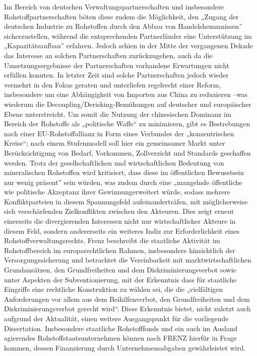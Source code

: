 \documentclass[12pt,a4paper,oneside]{book} %
\begin{document}
Im Bereich von deutschen Verwaltungspartnerschaften und insbesondere Rohstoffpartnerschaften böten diese zudem die Möglichkeit, den „Zugang der deutschen Industrie zu Rohstoffen durch den Abbau von Handelshemmnissen” sicherzustellen, während die entsprechenden Partnerländer eine Unterstützung im „Kapazitätsaufbau” erfahren.\autocite{ruttinger_deutschen_2016} Jedoch schien in der Mitte der vergangenen Dekade das Interesse an solchen Partnerschaften zurückzugehen, auch da die Umsetzungsergebnisse der Partnerschaften vorhandene Erwartungen nicht erfüllen konnten.\autocite{ruttinger_deutschen_2016} In letzter Zeit sind solche Partnerschaften jedoch wieder vermehrt in den Fokus geraten und unterliefen regelrecht einer \glqq Reform\grqq, insbesondere um eine Abhängigkeit von Importen aus China zu reduzieren\autocite{muller_reform_2023} --was wiederum die Decoupling/Derisking-Bemühungen auf deutscher und europäischer Ebene unterstreicht. Um somit die Nutzung der chinesischen Dominanz im Bereich der Rohstoffe als „politische Waffe“ zu minimieren, gibt es Bestrebungen nach einer EU-Rohstoffallianz in Form eines Verbundes der „konzentrischen Kreise“; nach einem Stufenmodell soll hier ein gemeinsamer Markt unter Berücksichtigung von Bedarf, Vorkommen, Zollverzicht und Standards geschaffen werden.\autocite{sauga_klub_2023} Trotz der gesellschaftlichen und wirtschaftlichen Bedeutung von mineralischen Rohstoffen wird kritisiert, dass diese im \glqq öffentlichen Bewusstsein nur wenig präsent” sein würden, was zudem durch eine „mangelnde öffentliche wie politische Akzeptanz ihrer Gewinnung\grqq erweitert würde, sodass mehrere Konfliktparteien in diesem Spannungsfeld aufeinanderträfen, mit möglicherweise sich verschärfenden Zielkonflikten zwischen den Akteuren.\autocite{kuhne_gewinnung_2020} Dies zeigt erneut einerseits die divergierenden Interessen nicht nur wirtschaftlicher Akteure in diesem Feld, sondern andererseits ein weiteres Indiz zur Erforderlichkeit eines Rohstoffverwaltungsrechts.
Frenz beschreibt die staatliche Aktivität im Rohstoffbereich im europarechtlichen Rahmen, insbesondere hinsichtlich der Versorgungssicherung und betrachtet die Vereinbarkeit mit marktwirtschaftlichen Grundansätzen, den Grundfreiheiten und dem Diskriminierungsverbot sowie unter Aspekten der Subventionierung, mit der Erkenntnis dass für staatliche Eingriffe eine rechtliche Konstruktion zu wählen sei, die die „vielfältigen Anforderungen vor allem aus dem Beihilfenverbot, den Grundfreiheiten und dem Diskriminierungsverbot gerecht wird“.\autocite{frenz_staatliche_2023} Diese Erkenntnis bietet, nicht zuletzt auch aufgrund der Aktualität, einen weitere Ausgangspunkt für die vorliegende Dissertation. Insbesondere staatliche Rohstofffonds und ein auch im Ausland agierendes Rohstoffstaatsunternehmen können nach FRENZ hierfür in Frage kommen, dessen Finanzierung durch Unternehmensabgaben gewährleistet wird.\autocite{frenz_unternehmensabgabe_2023}
\end{document}
